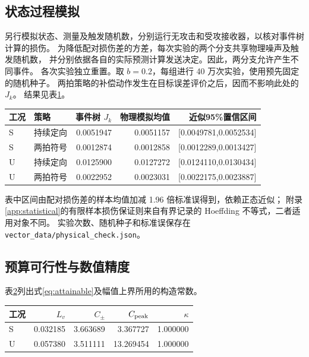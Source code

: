 \subsection{状态过程模拟}
另行模拟状态、测量及触发随机数，分别运行无攻击和受攻接收器，以核对事件树计算的损伤。
为降低配对损伤差的方差，每次实验的两个分支共享物理噪声及触发随机数，
并分别依据各自的实际预测计算发送决定。因此，两分支允许产生不同事件。
各次实验独立重置。取 $b=0.2$，每组进行 40 万次实验，使用预先固定的随机种子。
两拍策略的补偿动作发生在目标误差评价之后，因而不影响此处的 $J_k$。
结果见表\ref{tab:physical-validation}。
\begin{table}[H]
\centering\small
{}
\label{tab:physical-validation}
\begin{tabular}{llrrr}
\toprule
工况 & 策略 & 事件树 $J_k$ & 物理模拟均值 & 近似95\%置信区间\\
\midrule
S & 持续定向 & 0.0051947 & 0.0051157 & [0.0049781,0.0052534]\\
S & 两拍符号 & 0.0012874 & 0.0012858 & [0.0012289,0.0013427]\\
U & 持续定向 & 0.0125900 & 0.0127272 & [0.0124110,0.0130434]\\
U & 两拍符号 & 0.0022952 & 0.0023031 & [0.0022175,0.0023887]\\
\bottomrule
\end{tabular}\end{table}
表中区间由配对损伤差的样本均值加减 1.96 倍标准误得到，依赖正态近似；
附录\ref{app:statistical}的有限样本损伤保证则来自有界记录的 Hoeffding 不等式，二者适用对象不同。
实验次数、随机种子和标准误保存在 \texttt{vector\_data/physical\_check.json}。

\subsection{预算可行性与数值精度}
表\ref{tab:vector-constants}列出式\eqref{eq:attainable}及幅值上界所用的构造常数。
\begin{table}[H]
\centering\small
{}
\label{tab:vector-constants}
\begin{tabular}{lrrrr}
\toprule
工况 & $L_v$ & $C_\pm$ & $C_{\rm peak}$ & $\kappa$\\
\midrule
S & 0.032185 & 3.663689 & 3.367727 & 1.000000 \\
U & 0.057380 & 3.511111 & 13.269454 & 1.000000 \\
\bottomrule
\end{tabular}
\end{table}

